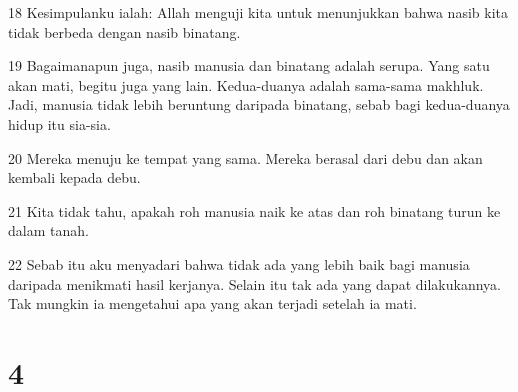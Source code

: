 \par 18 Kesimpulanku ialah: Allah menguji kita untuk menunjukkan bahwa nasib kita tidak berbeda dengan nasib binatang.
\par 19 Bagaimanapun juga, nasib manusia dan binatang adalah serupa. Yang satu akan mati, begitu juga yang lain. Kedua-duanya adalah sama-sama makhluk. Jadi, manusia tidak lebih beruntung daripada binatang, sebab bagi kedua-duanya hidup itu sia-sia.
\par 20 Mereka menuju ke tempat yang sama. Mereka berasal dari debu dan akan kembali kepada debu.
\par 21 Kita tidak tahu, apakah roh manusia naik ke atas dan roh binatang turun ke dalam tanah.
\par 22 Sebab itu aku menyadari bahwa tidak ada yang lebih baik bagi manusia daripada menikmati hasil kerjanya. Selain itu tak ada yang dapat dilakukannya. Tak mungkin ia mengetahui apa yang akan terjadi setelah ia mati.

\chapter{4}

